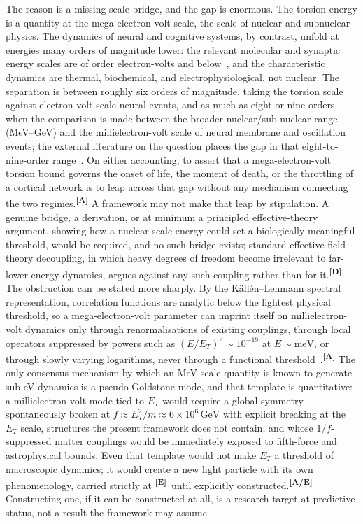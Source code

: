 \documentclass[12pt,a4paper,twoside]{article}
\theoremstyle{plain}
\theoremstyle{definition}
\theoremstyle{remark}
\newcommand{\catmark}[1]{\textsuperscript{\textsf{\textbf{[#1]}}}}
\begin{document}
The reason is a missing scale bridge, and the gap is enormous. The torsion energy is a quantity at the mega-electron-volt scale, the scale of nuclear and subnuclear physics. The dynamics of neural and cognitive systems, by contrast, unfold at energies many orders of magnitude lower: the relevant molecular and synaptic energy scales are of order electron-volts and below~\cite{attwell2001,harris2012,levy2021}, and the characteristic dynamics are thermal, biochemical, and electrophysiological, not nuclear. The separation is between roughly six orders of magnitude, taking the torsion scale against electron-volt-scale neural events, and as much as eight or nine orders when the comparison is made between the broader nuclear/sub-nuclear range (MeV--GeV) and the millielectron-volt scale of neural membrane and oscillation events; the external literature on the question places the gap in that eight-to-nine-order range~\cite{appelquist1975}. On either accounting, to assert that a mega-electron-volt torsion bound governs the onset of life, the moment of death, or the throttling of a cortical network is to leap across that gap without any mechanism connecting the two regimes.\catmark{A} A framework may not make that leap by stipulation. A genuine bridge, a derivation, or at minimum a principled effective-theory argument, showing how a nuclear-scale energy could set a biologically meaningful threshold, would be required, and no such bridge exists; standard effective-field-theory decoupling, in which heavy degrees of freedom become irrelevant to far-lower-energy dynamics, argues against any such coupling rather than for it.\catmark{D} The obstruction can be stated more sharply. By the K\"all\'en--Lehmann spectral representation, correlation functions are analytic below the lightest physical threshold, so a mega-electron-volt parameter can imprint itself on millielectron-volt dynamics only through renormalisations of existing couplings, through local operators suppressed by powers such as $(E/E_T)^{2} \sim 10^{-19}$ at $E \sim \mathrm{meV}$, or through slowly varying logarithms, never through a functional threshold~\cite{appelquist1975}.\catmark{A} The only consensus mechanism by which an MeV-scale quantity is known to generate sub-eV dynamics is a pseudo-Goldstone mode, and that template is quantitative: a millielectron-volt mode tied to $E_T$ would require a global symmetry spontaneously broken at $f \approx E_T^{2}/m \approx 6\times10^{6}\,\mathrm{GeV}$ with explicit breaking at the $E_T$ scale, structures the present framework does not contain, and whose $1/f$-suppressed matter couplings would be immediately exposed to fifth-force and astrophysical bounds. Even that template would not make $E_T$ a threshold of macroscopic dynamics; it would create a new light particle with its own phenomenology, carried strictly at \catmark{E}\ until explicitly constructed.\catmark{A/E} Constructing one, if it can be constructed at all, is a research target at predictive status, not a result the framework may assume.
\end{document}
